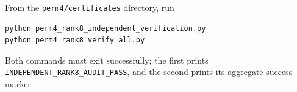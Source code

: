 From the \texttt{perm4/certificates} directory, run
\begin{verbatim}
python perm4_rank8_independent_verification.py
python perm4_rank8_verify_all.py
\end{verbatim}
Both commands must exit successfully; the first prints
\texttt{INDEPENDENT\_RANK8\_AUDIT\_PASS}, and the second prints its aggregate
success marker.
\endgroup
